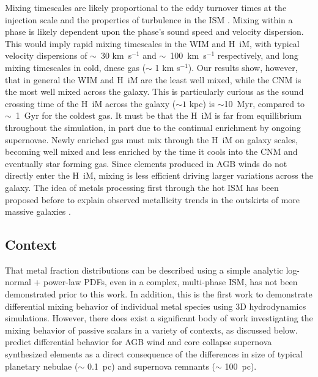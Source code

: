 \documentclass[twocolumn]{aastex61}
\begin{document}
%
%
Mixing timescales are likely proportional to the eddy turnover times at the injection scale \citep{PanScannapieco2010, Colbrook2017} and the properties of turbulence in the ISM \citep{YangKrumholz2012}. Mixing within a phase is likely dependent upon the phase's sound speed and velocity dispersion. This would imply rapid mixing timescales in the WIM and H~{\sc i}M, with typical velocity dispersions of $\sim$~30 km~s$^{-1}$ and $\sim$~100~km~s$^{-1}$ respectively, and long mixing timescales in cold, dnese gas ($\sim$ 1 km s$^{-1}$). Our results show, however, that in general the WIM and H~{\sc i}M are the least well mixed, while the CNM is the most well mixed across the galaxy. This is particularly curious as the sound crossing time of the H~{\sc i}M across the galaxy ($\sim 1$ kpc) is $\sim$10~Myr, compared to $\sim$~1~Gyr for the coldest gas. It must be that the H~{\sc i}M is far from equillibrium throughout the simulation, in part due to the continual enrichment by ongoing supernovae. Newly enriched gas must mix through the H~{\sc i}M on galaxy scales, becoming well mixed and less enriched by the time it cools into the CNM and eventually star forming gas. Since elements produced in AGB winds do not directly enter the H~{\sc i}M, mixing is less efficient driving larger variations across the galaxy. The idea of metals processing first through the hot ISM has been proposed before to explain observed metallicity trends in the outskirts of more massive galaxies \citep{Tassis2008,Werk2011}. 

\subsection{Context}
\label{sec:context}
That metal fraction distributions can be described using a simple analytic log-normal + power-law PDFs, even in a complex, multi-phase ISM, has not been demonstrated prior to this work.   In addition, this is the first work to demonstrate differential mixing behavior of individual metal species using 3D hydrodynamics simulations. However, there does exist a significant body of work investigating the mixing behavior of passive scalars in a variety of contexts, as discussed below. \cite{KrumholzTing2018} predict differential behavior for AGB wind and core collapse supernova synthesized elements as a direct consequence of the differences in size of typical planetary nebulae ($\sim$ 0.1~pc) and supernova remnants ($\sim$ 100~pc). 
\end{document}
